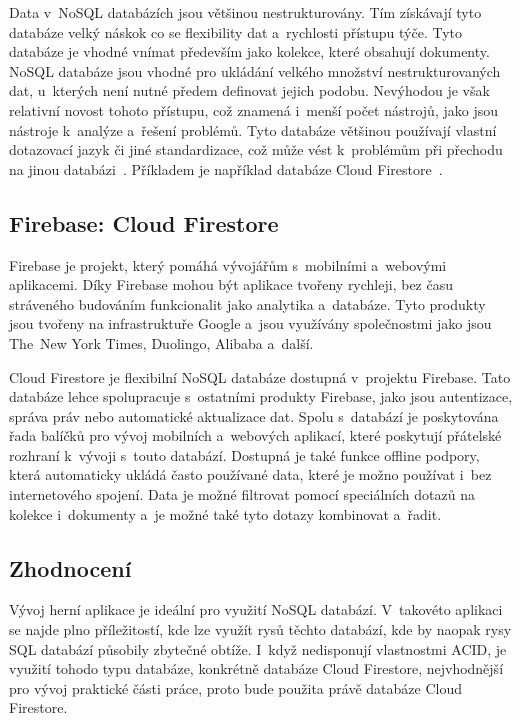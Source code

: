 Data v~NoSQL databázích jsou většinou nestrukturovány.
Tím získávají tyto databáze velký náskok co se flexibility dat a~rychlosti
přístupu týče.
Tyto databáze je vhodné vnímat především jako kolekce,
které obsahují dokumenty. 
NoSQL databáze jsou vhodné pro ukládání velkého množství nestrukturovaných dat,
u~kterých není nutné předem definovat jejich podobu.
Nevýhodou je však relativní novost tohoto přístupu,
což znamená i~menší počet nástrojů,
jako jsou nástroje k~analýze a~řešení problémů.
Tyto databáze většinou používají vlastní dotazovací jazyk či jiné standardizace,
což může vést k~problémům při přechodu na jinou databázi~\cite{sql_nosql}.
Příkladem je například databáze Cloud Firestore~\cite{cloud_firestore}.

\subsection{Firebase: Cloud Firestore}

Firebase je projekt,
který pomáhá vývojářům s~mobilními a~webovými aplikacemi.
Díky Firebase mohou být aplikace tvořeny rychleji,
bez času stráveného budováním funkcionalit jako analytika a~databáze.
Tyto produkty jsou tvořeny na infrastruktuře Google
a~jsou využívány společnostmi jako jsou The~New York Times,
Duolingo, Alibaba a~další.~\cite{firebase}

Cloud Firestore je flexibilní NoSQL databáze dostupná v~projektu \mbox{Firebase}.
Tato databáze lehce spolupracuje s~ostatními produkty Firebase,
jako jsou autentizace, správa práv nebo automatické aktualizace dat.
Spolu s~databází je poskytována řada balíčků pro vývoj mobilních a~webových
aplikací,
které poskytují přátelské rozhraní k~vývoji s~touto databází.
Dostupná je také funkce offline podpory,
která automaticky ukládá často používané data,
které je možno používat i~bez internetového spojení.
Data je možné filtrovat pomocí speciálních dotazů na kolekce i~dokumenty
a~je možné také tyto dotazy kombinovat a~řadit.~\cite{cloud_firestore}

\subsection{Zhodnocení}

Vývoj herní aplikace je ideální pro využití NoSQL databází.
V~takovéto aplikaci se najde plno příležitostí,
kde lze využít rysů těchto databází,
kde by naopak rysy SQL databází působily zbytečné obtíže.
I~když nedisponují vlastnostmi ACID,
je využití tohodo typu databáze,
konkrétně databáze Cloud Firestore,
nejvhodnější pro vývoj praktické části práce,
proto bude použita právě databáze Cloud Firestore.
